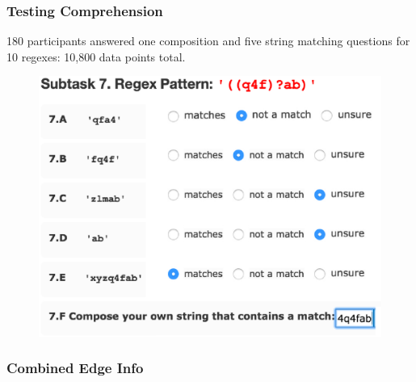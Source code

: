 \begin{frame}
\frametitle{Testing Comprehension}
% 
\begin{center}
180 participants answered one composition and five string matching questions for 10 regexes: 10,800 data points total.
\end{center}
\begin{figure}
  \includegraphics[scale=0.48]{nontex/illustrations/exampleQuestion.eps}
  \label{fig:exampleQuestion}
\end{figure}
\end{frame}



\begin{frame}
\frametitle{Combined Edge Info}

\end{frame}




